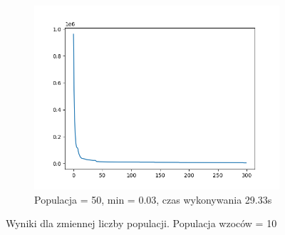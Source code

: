 \documentclass[12pt]{article}
\begin{document}
\begin{figure}[H]
\begin{subfigure}{0.32\textwidth}
    \end{subfigure}
    \begin{subfigure}{0.32\textwidth}
        \centering
        \includegraphics[width=\linewidth]{plots/c3.png}
        \caption{Populacja = 50, min = 0.03, czas wykonywania 29.33s}
    \end{subfigure}
    \caption{Wyniki dla zmiennej liczby populacji. Populacja wzoców = 10}
\end{figure}
\end{document}
